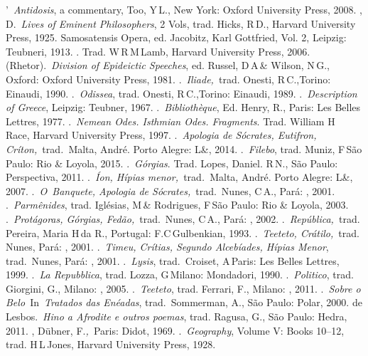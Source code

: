 {\begin{bibliohedra}
'~\emph{Antidosis}, a commentary, Too, Y\,L., New York:
  Oxford University Press, 2008.
, D.~\emph{Lives of Eminent Philosophers}, 2 Vols, trad.
  Hicks, R\,D., Harvard University Press, 1925.
 Samosatensis Opera, ed. Jacobitz, Karl Gottfried, Vol. 2,
  Leipzig: Teubneri, 1913.
. Trad. W\,R\,M\,Lamb, Harvard University Press, 2006.
 (Rhetor).~\emph{Division of Epideictic Speeches}, ed. Russel,
  D\,A\,\& Wilson, N\,G., Oxford: Oxford University Press, 1981.
.~\emph{Iliade,~}trad. Onesti, R\,C.,Torino: Einaudi, 1990.
.~\emph{Odissea}, trad. Onesti, R\,C.,Torino: Einaudi, 1989.
.~\emph{Description of Greece}, Leipzig: Teubner, 1967.
.~\emph{Bibliothèque}, Ed. Henry, R., Paris: Les Belles
  Lettres, 1977.
.~\emph{Nemean Odes. Isthmian Odes. Fragments}. Trad. William H\,  Race, Harvard University Press, 1997.
.~\emph{Apologia de Sócrates, Eutifron,
  Críton,~}trad\emph{.}~Malta, André. Porto Alegre: L\&, 2014.
.~\emph{Filebo}, trad. Muniz, F\,São Paulo:  Rio \& Loyola,
  2015.
.~\emph{Górgias}. Trad. Lopes, Daniel. R\,N., São Paulo:
  Perspectiva, 2011.
.\emph{~Íon, Hípias menor,~}trad\emph{.}~Malta, André. Porto
  Alegre: L\&, 2007.
.~\emph{O~Banquete, Apologia de Sócrates,}~trad.~Nunes, C\,A.,
  Pará: , 2001.
.~\emph{Parmênides}, trad. Iglésias, M\,\& Rodrigues, F\,São
  Paulo:  Rio \& Loyola, 2003.
.~\emph{Protágoras, Górgias, Fedão,}~trad.~Nunes, C\,A., Pará:
  , 2002.
.~\emph{República,~}trad. Pereira, Maria H\,da R., Portugal:
  F.C\,Gulbenkian, 1993.
.~\emph{Teeteto, Crátilo,}~trad. Nunes, Pará: , 2001.
.~\emph{Timeu, Crítias, Segundo Alcebíades, Hípias Menor},
  trad.~Nunes, Pará: , 2001.
.~\emph{Lysis}, trad.~Croiset, A\,Paris: Les Belles Lettres,
  1999.
.~\emph{La Repubblica}, trad. Lozza, G\,Milano: Mondadori,
  1990.
.~\emph{Politico}, trad. Giorgini, G., Milano: , 2005.
.~\emph{Teeteto}, trad. Ferrari, F., Milano: , 2011.
.~\emph{Sobre o Belo~}In~\emph{Tratados das Enéadas},
  trad.~Sommerman, A., São Paulo: Polar, 2000.
 de Lesbos.~\emph{Hino a Afrodite e outros poemas}, trad. Ragusa,
  G., São Paulo: Hedra, 2011.
, Dübner, F.\emph{,~}Paris:
  Didot, 1969.
.~\emph{Geography}, Volume V: Books 10--12, trad. H\,L\,Jones,
  Harvard University Press, 1928.
\end{bibliohedra}

}

